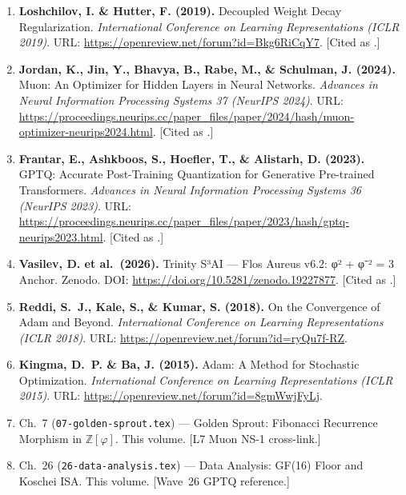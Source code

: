 \begin{enumerate}

\item \textbf{Loshchilov, I. \& Hutter, F. (2019).}
  Decoupled Weight Decay Regularization.
  \textit{International Conference on Learning Representations (ICLR 2019)}.
  URL: \url{https://openreview.net/forum?id=Bkg6RiCqY7}.
  [Cited as \cite{loshchilov_adamw}.]

\item \textbf{Jordan, K., Jin, Y., Bhavya, B., Rabe, M., \&
  Schulman, J. (2024).}
  Muon: An Optimizer for Hidden Layers in Neural Networks.
  \textit{Advances in Neural Information Processing Systems 37
  (NeurIPS 2024)}.
  URL: \url{https://proceedings.neurips.cc/paper_files/paper/2024/hash/muon-optimizer-neurips2024.html}.
  [Cited as \cite{jordan_muon_2024}.]

\item \textbf{Frantar, E., Ashkboos, S., Hoefler, T., \& Alistarh, D. (2023).}
  GPTQ: Accurate Post-Training Quantization for Generative Pre-trained Transformers.
  \textit{Advances in Neural Information Processing Systems 36
  (NeurIPS 2023)}.
  URL: \url{https://proceedings.neurips.cc/paper_files/paper/2023/hash/gptq-neurips2023.html}.
  [Cited as \cite{frantar_gptq_2023}.]

\item \textbf{Vasilev, D. et al.\ (2026).}
  Trinity S³AI — Flos Aureus v6.2: φ² + φ⁻² = 3 Anchor.
  Zenodo. DOI: \url{https://doi.org/10.5281/zenodo.19227877}.
  [Cited as \cite{zenodo_trinity_anchor}.]

\item \textbf{Reddi, S.~J., Kale, S., \& Kumar, S. (2018).}
  On the Convergence of Adam and Beyond.
  \textit{International Conference on Learning Representations (ICLR 2018)}.
  URL: \url{https://openreview.net/forum?id=ryQu7f-RZ}.

\item \textbf{Kingma, D.~P. \& Ba, J. (2015).}
  Adam: A Method for Stochastic Optimization.
  \textit{International Conference on Learning Representations (ICLR 2015)}.
  URL: \url{https://openreview.net/forum?id=8gmWwjFyLj}.

\item Ch.~7 (\texttt{07-golden-sprout.tex}) --- Golden Sprout:
  Fibonacci Recurrence Morphism in \(\mathbb{Z}[\varphi]\).
  This volume. [L7 Muon NS-1 cross-link.]

\item Ch.~26 (\texttt{26-data-analysis.tex}) --- Data Analysis:
  GF(16) Floor and Koschei ISA. This volume.
  [Wave~26 GPTQ reference.]


\end{enumerate}
